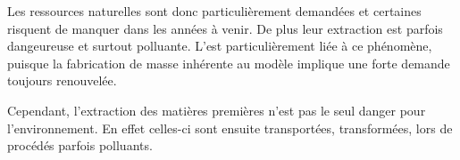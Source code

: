 \smallbreak Les ressources naturelles sont donc particulièrement demandées et certaines risquent de manquer dans les années à venir. De plus leur extraction est parfois dangeureuse et surtout polluante. L'\op est particulièrement liée à ce phénomène, puisque la fabrication de masse inhérente au modèle implique une forte demande toujours renouvelée. 

Cependant, l'extraction des matières premières n'est pas le seul danger pour l'environnement. En effet celles-ci sont ensuite transportées, transformées, lors de procédés parfois polluants.






